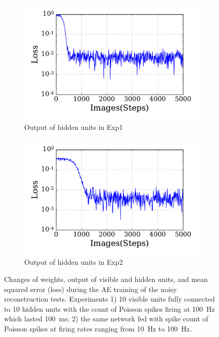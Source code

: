 \begin{figure}
\begin{subfigure}[t]{0.48\textwidth}
		\DIFaddendFL \includegraphics[width=\textwidth]{pics_sdlm/21_exp_AE_noise/exp1_loss_s.pdf}
		\caption{Output of hidden units in Exp1}
	\end{subfigure}
	\DIFdelbeginFL %
\DIFdelendFL \DIFaddbeginFL \begin{subfigure}[t]{0.48\textwidth}
		\DIFaddendFL \includegraphics[width=\textwidth]{pics_sdlm/21_exp_AE_noise/exp2_loss_s.pdf}
		\caption{Output of hidden units in Exp2}
	\end{subfigure}
	\DIFdelbeginFL %
\DIFdelendFL \DIFaddbeginFL \caption[AE training of the reconstruction tests given noisy data.]{\DIFaddendFL Changes of weights, output of visible and hidden units, and mean squared error (loss) during the AE training of the noisy reconstruction tests. 
		Experiments 1) 10 visible units fully connected to 10 hidden units with the count of Poisson spikes firing at 100~Hz which lasted 100~ms; 2) the same network fed with spike count of Poisson spikes at firing rates ranging from 10~Hz to 100~Hz.}
	\label{fig:ae_noise}
\end{figure}

